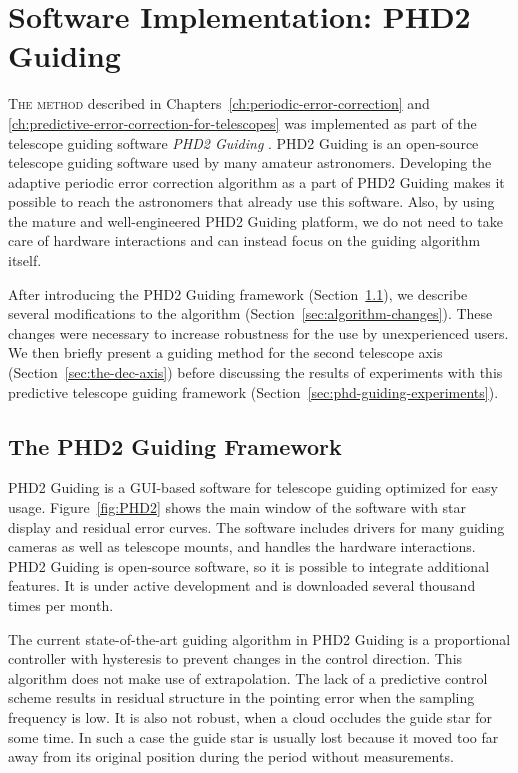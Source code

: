 \chapter{Software Implementation: PHD2 Guiding}
\label{ch:software-implementation-phd-guiding}

\lettrine{T}{he method} described in Chapters~\ref{ch:periodic-error-correction}
and \ref{ch:predictive-error-correction-for-telescopes} was implemented as part
of the telescope guiding software \emph{PHD2 Guiding} \cite{Stark.ea:2016:PHD2}.
PHD2 Guiding is an open-source telescope guiding software used by many amateur
astronomers. Developing the adaptive periodic error correction algorithm as a
part of PHD2 Guiding makes it possible to reach the astronomers that
already use this software. Also, by using the mature and well-engineered PHD2
Guiding platform, we do not need to take care of hardware interactions and can
instead focus on the guiding algorithm itself.

After introducing the PHD2 Guiding framework
(Section~\ref{sec:phd2-guiding-framework}), we describe several modifications
to the algorithm (Section~\ref{sec:algorithm-changes}). These changes were
necessary to increase robustness for the use by unexperienced users.
We then briefly present a guiding method for the second telescope axis
(Section~\ref{sec:the-dec-axis}) before discussing the results of experiments
with this predictive telescope guiding framework
(Section~\ref{sec:phd-guiding-experiments}).

\section{The PHD2 Guiding Framework}
\label{sec:phd2-guiding-framework}

PHD2 Guiding is a GUI-based software for telescope guiding optimized for
easy usage. Figure~\ref{fig:PHD2} shows the main window of the software with
star display and residual error curves. The software includes drivers for many
guiding cameras as well as telescope mounts, and handles the hardware
interactions. PHD2 Guiding is open-source software, so it is possible to
integrate additional features. It is under active development and is downloaded
several thousand times per month.

The current state-of-the-art guiding algorithm in PHD2 Guiding is a
proportional controller with hysteresis to prevent changes in the control
direction. This algorithm does not make use of extrapolation. The lack of a
predictive control scheme results in residual structure in the pointing error
when the sampling frequency is low. It is also not robust, \eg when a cloud
occludes the guide star for some time. In such a case the guide star is
usually lost because it moved too far away from its original position during the
period without measurements.


